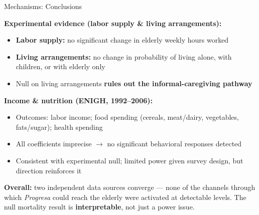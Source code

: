 \documentclass[aspectratio=169,usenames,dvipsnames]{beamer}
\begin{document}
\begin{frame}{Mechanisms: Conclusions}\label{mechanisms_enigh}
\small

\textbf{Experimental evidence (labor supply \& living arrangements):}
\begin{itemize}
  \item[$\circ$] \textbf{Labor supply:} no significant change in elderly weekly hours worked
  \item[$\circ$] \textbf{Living arrangements:} no change in probability of living alone, with children, or with elderly only
  \item[$\circ$] Null on living arrangements \textbf{rules out the informal-caregiving pathway}
\end{itemize}

\vspace{6pt}

\textbf{Income \& nutrition (ENIGH, 1992--2006):}
\begin{itemize}
  \item[$\circ$] Outcomes: labor income; food spending (cereals, meat/dairy, vegetables, fats/sugar); health spending
  \item[$\circ$] All coefficients imprecise $\to$ no significant behavioral responses detected
  \item[$\circ$] Consistent with experimental null; limited power given survey design, but direction reinforces it
\end{itemize}

\vspace{6pt}

\textbf{Overall:} two independent data sources converge --- none of the channels through which \textit{Progresa} could reach the elderly were activated at detectable levels. The null mortality result is \textbf{interpretable}, not just a power issue.

\end{frame}

\end{document}
